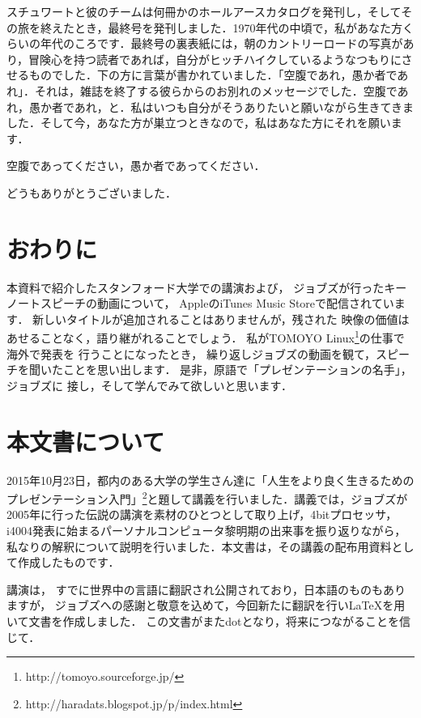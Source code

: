 \documentclass[twocolumn]{jsarticle}
\begin{document}
スチュワートと彼のチームは何冊かのホールアースカタログを発刊し，そしてその旅を終えたとき，最終号を発刊しました．1970年代の中頃で，私があなた方くらいの年代のころです．最終号の裏表紙には，朝のカントリーロードの写真があり，冒険心を持つ読者であれば，自分がヒッチハイクしているようなつもりにさせるものでした．下の方に言葉が書かれていました．「空腹であれ，愚か者であれ」．それは，雑誌を終了する彼らからのお別れのメッセージでした．空腹であれ，愚か者であれ，と．私はいつも自分がそうありたいと願いながら生きてきました．そして今，あなた方が巣立つときなので，私はあなた方にそれを願います．

空腹であってください，愚か者であってください．

どうもありがとうございました．

\newpage

\section*{おわりに}


本資料で紹介したスタンフォード大学での講演および，
ジョブズが行ったキーノートスピーチの動画について，
AppleのiTunes Music Storeで配信されています．
新しいタイトルが追加されることはありませんが，残された
映像の価値はあせることなく，語り継がれることでしょう．
私がTOMOYO Linux\footnote{http://tomoyo.sourceforge.jp/}の仕事で海外で発表を
行うことになったとき，
繰り返しジョブズの動画を観て，スピーチを聞いたことを思い出します．
是非，原語で「プレゼンテーションの名手」，ジョブズに
接し，そして学んでみて欲しいと思います．

\appendix


\section{本文書について}

2015年10月23日，都内のある大学の学生さん達に「人生をより良く生きるための
プレゼンテーション入門」\footnote{http://haradats.blogspot.jp/p/index.html}と題して講義を行いました．講義では，ジョブズが
2005年に行った伝説の講演を素材のひとつとして取り上げ，4bitプロセッサ，
i4004発表に始まるパーソナルコンピュータ黎明期の出来事を振り返りながら，
私なりの解釈について説明を行いました．本文書は，その講義の配布用資料として作成したものです．

講演は，
すでに世界中の言語に翻訳され公開されており，日本語のものもありますが，
ジョブズへの感謝と敬意を込めて，今回新たに翻訳を行い\LaTeX を用いて文書を作成しました．
この文書がまたdotとなり，将来につながることを信じて．
\end{document}
